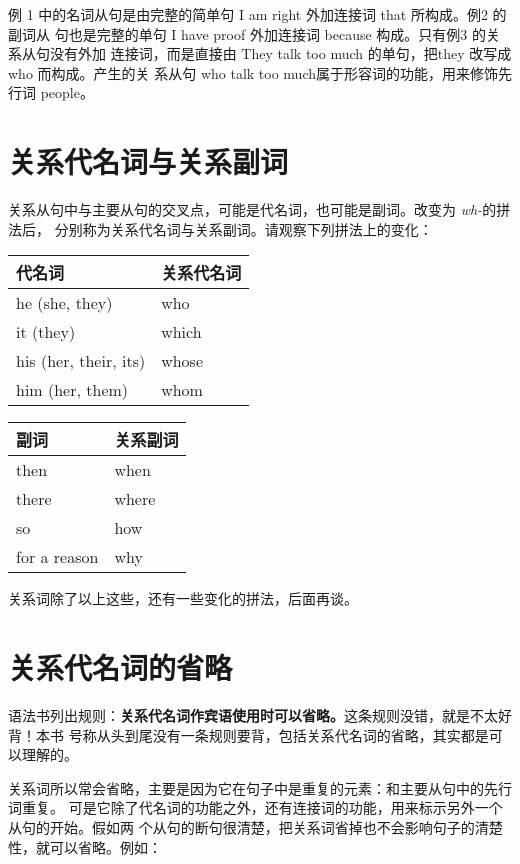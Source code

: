 例 1 中的名词从句是由完整的简单句 I am right 外加连接词 that 所构成。例2 的副词从
句也是完整的单句 I have proof 外加连接词 because 构成。只有例3 的关系从句没有外加
连接词，而是直接由 They talk too much 的单句，把they 改写成 who 而构成。产生的关
系从句 who talk too much属于形容词的功能，用来修饰先行词 people。

\section{关系代名词与关系副词}

关系从句中与主要从句的交叉点，可能是代名词，也可能是副词。改变为 \emph{wh-}的拼法后，
分别称为关系代名词与关系副词。请观察下列拼法上的变化：

\begin{longtable}[]{@{}ll@{}}
  \toprule
  代名词 & 关系代名词 \\
  \midrule
  he (she, they) & who \\
  it (they) & which \\
  his (her, their, its) & whose \\
  him (her, them) & whom \\
  \bottomrule
\end{longtable}

\begin{longtable}[]{@{}ll@{}}
  \toprule
  副词 & 关系副词 \\
  \midrule
  then & when \\
  there & where \\
  so & how \\
  for a reason & why \\
  \bottomrule
\end{longtable}

关系词除了以上这些，还有一些变化的拼法，后面再谈。

\section{关系代名词的省略}

语法书列出规则：\textbf{关系代名词作宾语使用时可以省略。}这条规则没错，就是不太好背！本书
号称从头到尾没有一条规则要背，包括关系代名词的省略，其实都是可以理解的。

关系词所以常会省略，主要是因为它在句子中是重复的元素：和主要从句中的先行词重复。
可是它除了代名词的功能之外，还有连接词的功能，用来标示另外一个从句的开始。假如两
个从句的断句很清楚，把关系词省掉也不会影响句子的清楚性，就可以省略。例如：

